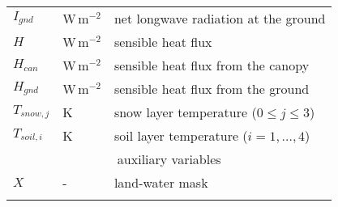 \begin{table}[t]
\begin{tabular}{lll}
        \(I_{gnd}\)    & W\,m$^{-2}$            & net longwave radiation at the ground \\
        \(H\)          & W\,m$^{-2}$            & sensible heat flux \\
        \(H_{can}\)    & W\,m$^{-2}$            & sensible heat flux from the canopy \\
        \(H_{gnd}\)    & W\,m$^{-2}$            & sensible heat flux from the ground \\
        \(T_{snow,j}\) & K                      & snow layer temperature (\(0 \leq j \leq 3\)) \\
        \(T_{soil,i}\) & K                      & soil layer temperature (\(i=1,\dots,4\)) \\
        [1pt]
        \multicolumn{3}{c}{auxiliary variables}                                             \\
        \(X\)          & -                      & land-water mask \\
        \bottomhline
    \end{tabular}
\end{table}
